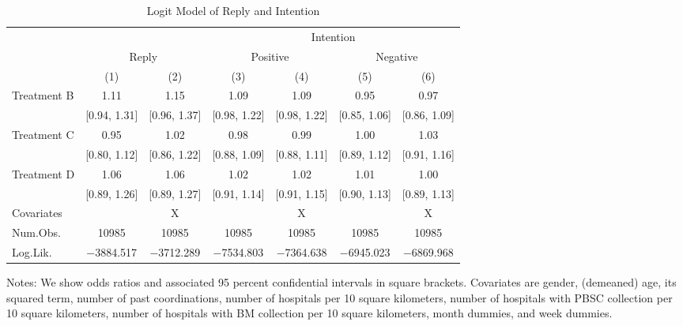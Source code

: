 \documentclass[
  11pt,
  a4paper
]{article}
\begin{document}
\begin{table}[H]

\caption{\label{tab:logit-stock}Logit Model of Reply and Intention}
\centering
\fontsize{9}{11}\selectfont
\begin{threeparttable}
\begin{tabular}[t]{lcccccc}
\toprule
\multicolumn{3}{c}{ } & \multicolumn{4}{c}{Intention} \\
\cmidrule(l{3pt}r{3pt}){4-7}
\multicolumn{1}{c}{ } & \multicolumn{2}{c}{Reply} & \multicolumn{2}{c}{Positive} & \multicolumn{2}{c}{Negative} \\
\cmidrule(l{3pt}r{3pt}){2-3} \cmidrule(l{3pt}r{3pt}){4-5} \cmidrule(l{3pt}r{3pt}){6-7}
  & (1) & (2) & (3) & (4) & (5) & (6)\\
\midrule
Treatment B & \num{1.11} & \num{1.15} & \num{1.09} & \num{1.09} & \num{0.95} & \num{0.97}\\
 & {}[\num{0.94}, \num{1.31}] & {}[\num{0.96}, \num{1.37}] & {}[\num{0.98}, \num{1.22}] & {}[\num{0.98}, \num{1.22}] & {}[\num{0.85}, \num{1.06}] & {}[\num{0.86}, \num{1.09}]\\
Treatment C & \num{0.95} & \num{1.02} & \num{0.98} & \num{0.99} & \num{1.00} & \num{1.03}\\
 & {}[\num{0.80}, \num{1.12}] & {}[\num{0.86}, \num{1.22}] & {}[\num{0.88}, \num{1.09}] & {}[\num{0.88}, \num{1.11}] & {}[\num{0.89}, \num{1.12}] & {}[\num{0.91}, \num{1.16}]\\
Treatment D & \num{1.06} & \num{1.06} & \num{1.02} & \num{1.02} & \num{1.01} & \num{1.00}\\
 & {}[\num{0.89}, \num{1.26}] & {}[\num{0.89}, \num{1.27}] & {}[\num{0.91}, \num{1.14}] & {}[\num{0.91}, \num{1.15}] & {}[\num{0.90}, \num{1.13}] & {}[\num{0.89}, \num{1.13}]\\
\midrule
Covariates &  & X &  & X &  & X\\
Num.Obs. & \num{10985} & \num{10985} & \num{10985} & \num{10985} & \num{10985} & \num{10985}\\
Log.Lik. & \num{-3884.517} & \num{-3712.289} & \num{-7534.803} & \num{-7364.638} & \num{-6945.023} & \num{-6869.968}\\
\bottomrule
\end{tabular}
\begin{tablenotes}
\item Notes: We show odds ratios and associated 95 percent confidential intervals in square brackets. Covariates are gender, (demeaned) age, its squared term, number of past coordinations, number of hospitals per 10 square kilometers, number of hospitals with PBSC collection per 10 square kilometers, number of hospitals with BM collection per 10 square kilometers, month dummies, and week dummies.
\end{tablenotes}
\end{threeparttable}
\end{table}
\end{document}

